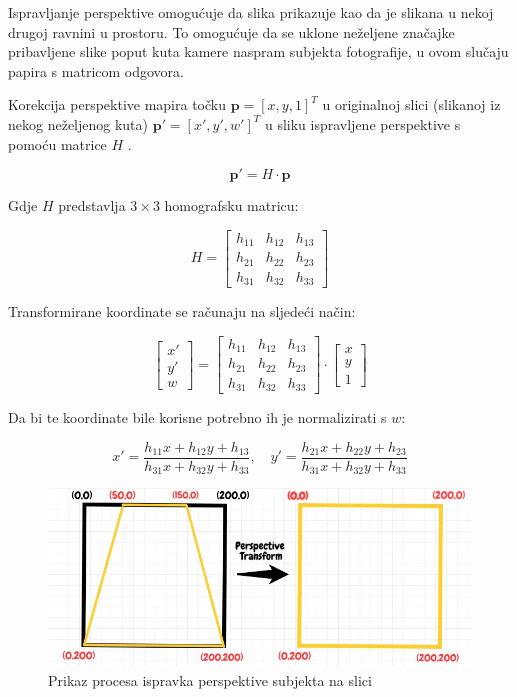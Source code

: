 \documentclass{foi}
\begin{document}
Ispravljanje perspektive omogućuje da slika prikazuje kao da je slikana u nekoj drugoj ravnini u prostoru. To omogućuje da se uklone neželjene značajke pribavljene slike poput kuta kamere naspram subjekta fotografije, u ovom slučaju papira s matricom odgovora. 

Korekcija perspektive mapira točku \( \mathbf{p} = [x, y, 1]^T \) u originalnoj slici (slikanoj iz nekog neželjenog kuta) \( \mathbf{p'} = [x', y', w']^T \) u sliku ispravljene perspektive s pomoću matrice \( H \) \cite{OpenCvPerpsective}.

\[
\mathbf{p'} = H \cdot \mathbf{p}
\]

Gdje \( H \) predstavlja \( 3 \times 3 \) homografsku matricu:

\[
H = 
\begin{bmatrix}
h_{11} & h_{12} & h_{13} \\
h_{21} & h_{22} & h_{23} \\
h_{31} & h_{32} & h_{33}
\end{bmatrix}
\]

Transformirane koordinate se računaju na sljedeći način:

\[
\begin{bmatrix}
x' \\
y' \\
w
\end{bmatrix}
=
\begin{bmatrix}
h_{11} & h_{12} & h_{13} \\
h_{21} & h_{22} & h_{23} \\
h_{31} & h_{32} & h_{33}
\end{bmatrix}
\cdot
\begin{bmatrix}
x \\
y \\
1
\end{bmatrix}
\]

Da bi te koordinate bile korisne potrebno ih je normalizirati s \( w \):

\[
x' = \frac{h_{11}x + h_{12}y + h_{13}}{h_{31}x + h_{32}y + h_{33}}, \quad
y' = \frac{h_{21}x + h_{22}y + h_{23}}{h_{31}x + h_{32}y + h_{33}}
\]

\begin{figure}[H]
    \centering
    \includegraphics[width=0.85\linewidth]{slike/perspective.png}
    \caption{Prikaz procesa ispravka perspektive subjekta na slici \cite{OpenCvPerpsective}}
\end{figure}
\end{document}
